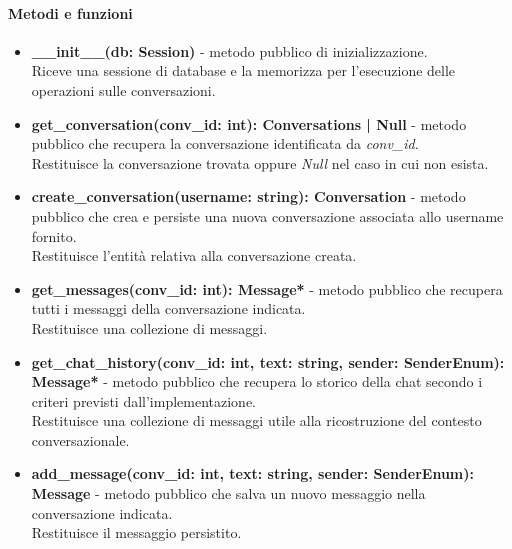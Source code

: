 \paragraph{Metodi e funzioni}
\begin{itemize}
	\item \textbf{\_\_init\_\_(db: Session)} - metodo pubblico di inizializzazione.\\
	Riceve una sessione di database e la memorizza per l'esecuzione delle operazioni sulle conversazioni.
	\item \textbf{get\_conversation(conv\_id: int): Conversations | Null} - metodo pubblico che recupera la conversazione identificata da \textit{conv\_id}.\\
	Restituisce la conversazione trovata oppure \textit{Null} nel caso in cui non esista.
	\item \textbf{create\_conversation(username: string): Conversation} - metodo pubblico che crea e persiste una nuova conversazione associata allo username fornito.\\
	Restituisce l'entit\`a relativa alla conversazione creata.
	\item \textbf{get\_messages(conv\_id: int): Message*} - metodo pubblico che recupera tutti i messaggi della conversazione indicata.\\
	Restituisce una collezione di messaggi.
	\item \textbf{get\_chat\_history(conv\_id: int, text: string, sender: SenderEnum): Message*} - metodo pubblico che recupera lo storico della chat secondo i criteri previsti dall'implementazione.\\
	Restituisce una collezione di messaggi utile alla ricostruzione del contesto conversazionale.
	\item \textbf{add\_message(conv\_id: int, text: string, sender: SenderEnum): Message} - metodo pubblico che salva un nuovo messaggio nella conversazione indicata.\\
	Restituisce il messaggio persistito.
\end{itemize}
